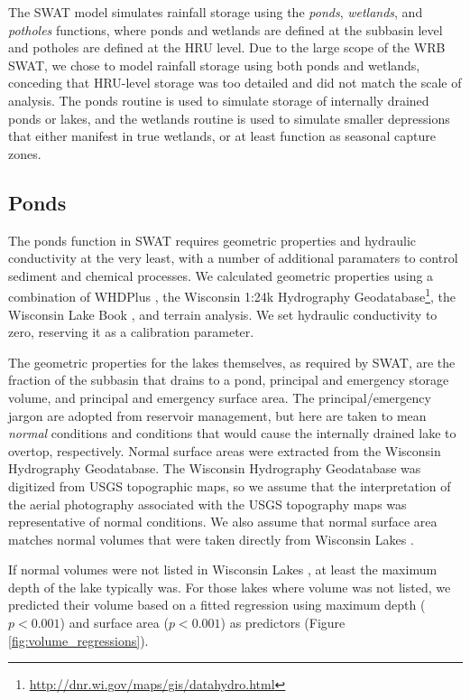 The SWAT model simulates rainfall storage using the \textit{ponds}, \textit{wetlands}, and \textit{potholes} functions, where ponds and wetlands are defined at the subbasin level and potholes are defined at the HRU level. Due to the large scope of the WRB SWAT, we chose to model rainfall storage using both ponds and wetlands, conceding that HRU-level storage was too detailed and did not match the scale of analysis. The ponds routine is used to simulate storage of internally drained ponds or lakes, and the wetlands routine is used to simulate smaller depressions that either manifest in true wetlands, or at least function as seasonal capture zones.

\subsection{Ponds}\label{sec:ponds}

The ponds function in SWAT requires geometric properties and hydraulic conductivity at the very least, with a number of additional paramaters to control sediment and chemical processes. We calculated geometric properties using a combination of WHDPlus \citep{wdnr_whdplus_2013}, the Wisconsin 1:24k Hydrography Geodatabase\footnote{\url{http://dnr.wi.gov/maps/gis/datahydro.html}}, the Wisconsin Lake Book , and terrain analysis. We set hydraulic conductivity to zero, reserving it as a calibration parameter.

The geometric properties for the lakes themselves, as required by SWAT, are the fraction of the subbasin that drains to a pond, principal and emergency storage volume, and principal and emergency surface area. The principal/emergency jargon are adopted from reservoir management, but here are taken to mean \textit{normal} conditions and conditions that would cause the internally drained lake to overtop, respectively. Normal surface areas were extracted from the Wisconsin Hydrography Geodatabase. The Wisconsin Hydrography Geodatabase was digitized from USGS topographic maps, so we assume that the interpretation of the aerial photography associated with the USGS topography maps was representative of normal conditions.  We also assume that normal surface area matches normal volumes that were taken directly from Wisconsin Lakes .

If normal volumes were not listed in Wisconsin Lakes , at least the maximum depth of the lake typically was. For those lakes where volume was not listed, we predicted their volume based on a fitted regression using maximum depth ($p < 0.001$) and surface area ($p < 0.001$) as predictors (Figure \ref{fig:volume_regressions}).

